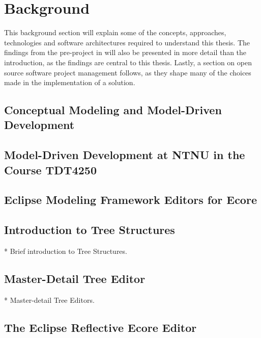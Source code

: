 \chapter{Background}\label{chap:background}

This background section will explain some of the concepts, approaches, technologies and software architectures required to understand this thesis.
The findings from the pre-project in \cite{rekstadModelingEnvironmentCloud2020} will also be presented in more detail than the introduction, as the findings are central to this thesis.
Lastly, a section on open source software project management follows, as they shape many of the choices made in the implementation of a solution.

\section{Conceptual Modeling and Model-Driven Development}\label{sec:conceptual-modeling}




\section{Model-Driven Development at NTNU in the Course TDT4250}\label{sec:tdt4250}




\section{Eclipse Modeling Framework Editors for Ecore}




\section{Introduction to Tree Structures}

* Brief introduction to Tree Structures.

\section{Master-Detail Tree Editor}

* Master-detail Tree Editors. 

\section{The Eclipse Reflective Ecore Editor}

